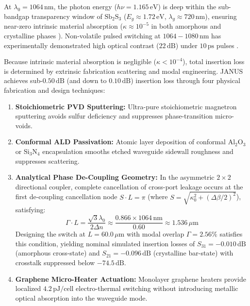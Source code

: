 \documentclass[journal]{IEEEtran}
\begin{document}
At $\lambda_0 = 1064\,\mathrm{nm}$, the photon energy ($h\nu = 1.165\,\mathrm{eV}$) is deep within the sub-bandgap transparency window of $\mathrm{Sb_2S_3}$ ($E_g \approx 1.72\,\mathrm{eV}$, $\lambda_g \approx 720\,\mathrm{nm}$), ensuring near-zero intrinsic material absorption ($\kappa \approx 10^{-5}$ in both amorphous and crystalline phases \cite{Delaney2020,Zhang2023MDM}). Non-volatile pulsed switching at $1064-1080\,\mathrm{nm}$ has experimentally demonstrated high optical contrast ($22\,\mathrm{dB}$) under $10\,\mathrm{ps}$ pulses \cite{PerezFrances2023}. 

Because intrinsic material absorption is negligible ($\kappa < 10^{-4}$), total insertion loss is determined by extrinsic fabrication scattering and modal engineering. JANUS achieves sub-$0.50\,\mathrm{dB}$ (and down to $0.10\,\mathrm{dB}$) insertion loss through four physical fabrication and design techniques:
\begin{enumerate}
\item \textbf{Stoichiometric PVD Sputtering:} Ultra-pure stoichiometric magnetron sputtering avoids sulfur deficiency and suppresses phase-transition micro-voids.
\item \textbf{Conformal ALD Passivation:} Atomic layer deposition of conformal $\mathrm{Al_2O_3}$ or $\mathrm{Si_3N_4}$ encapsulation smooths etched waveguide sidewall roughness and suppresses scattering.
\item \textbf{Analytical Phase De-Coupling Geometry:} In the asymmetric $2 \times 2$ directional coupler, complete cancellation of cross-port leakage occurs at the first de-coupling cancellation node $S \cdot L = \pi$ (where $S = \sqrt{\kappa_0^2 + (\Delta\beta/2)^2}$), satisfying:
\begin{equation}
\Gamma \cdot L = \frac{\sqrt{3}\lambda_0}{2\Delta n} \approx \frac{0.866 \times 1064\,\mathrm{nm}}{0.60} \approx 1.536\,\mu\mathrm{m}
\end{equation}
Designing the switch at $L = 60.0\,\mu\mathrm{m}$ with modal overlap $\Gamma = 2.56\%$ satisfies this condition, yielding nominal simulated insertion losses of $S_{31} = -0.010\,\mathrm{dB}$ (amorphous cross-state) and $S_{21} = -0.096\,\mathrm{dB}$ (crystalline bar-state) with crosstalk suppressed below $-74.5\,\mathrm{dB}$.
\item \textbf{Graphene Micro-Heater Actuation:} Monolayer graphene heaters provide localized $4.2\,\mathrm{pJ/cell}$ electro-thermal switching without introducing metallic optical absorption into the waveguide mode.
\end{enumerate}
\end{document}
